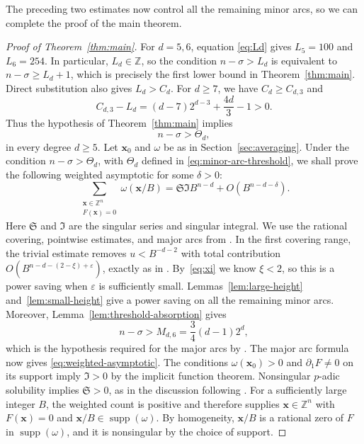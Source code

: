 \documentclass[reqno,a4paper,11pt]{amsart}
\numberwithin{equation}{section}
\newcommand{\ZZ}{\mathbb Z}
\newcommand{\x}{\mathbf{x}}
\newcommand{\eps}{\varepsilon}
\theoremstyle{plain}
\theoremstyle{definition}
\begin{document}
The preceding two estimates now control all the remaining minor arcs, so we can complete the proof of the main theorem.
\medskip

\begin{proof}[Proof of Theorem~\ref{thm:main}]
For \(d=5,6\), equation \eqref{eq:Ld} gives \(L_5=100\) and \(L_6=254\).
In particular, \(L_d\in\ZZ\), so the condition \(n-\sigma>L_d\) is equivalent to \(n-\sigma\geq L_d+1\), which is precisely the first lower bound in Theorem~\ref{thm:main}.
Direct substitution also gives \(L_d>C_d\).
For \(d\geq7\), we have \(C_d\geq C_{d,3}\) and
\[
 C_{d,3}-L_d
 =(d-7)2^{d-3}+\frac{4d}{3}-1>0.
\]
Thus the hypothesis of Theorem~\ref{thm:main} implies
\[
 n-\sigma>\Theta_d,
\]
in every degree \(d\geq5\).
Let \(\x_0\) and \(\omega\) be as in Section~\ref{sec:averaging}.
Under the condition \(n-\sigma>\Theta_d\), with \(\Theta_d\) defined in \eqref{eq:minor-arc-threshold}, we shall prove the following weighted asymptotic for some \(\delta>0\):
\begin{equation}\label{eq:weighted-asymptotic}
 \sum_{\substack{\x\in\ZZ^n\\F(\x)=0}}\omega(\x/B)
 =\mathfrak S\mathfrak I B^{n-d}
 +O(B^{n-d-\delta}).
\end{equation}
Here \(\mathfrak S\) and \(\mathfrak I\) are the singular series and singular integral.
We use the rational covering, pointwise estimates, and major arcs from \cite[Sections~3--5]{bp}.
In the first covering range, the trivial estimate removes \(u<B^{-d-2}\) with total contribution \(O(B^{n-d-(2-\xi)+\eps})\), exactly as in \cite[Proof of Lemma~4.2]{bp}.
By~\eqref{eq:xi} we know \(\xi<2\), so this is a power saving when \(\eps\) is sufficiently small.
Lemmas~\ref{lem:large-height} and~\ref{lem:small-height} give a power saving on all the remaining minor arcs.
Moreover, Lemma~\ref{lem:threshold-absorption} gives
\[
 n-\sigma>M_{d,6}
 =\frac34(d-1)2^d,
\]
which is the hypothesis required for the major arcs by \cite[Lemma~5.1]{bp}.
The major arc formula now gives \eqref{eq:weighted-asymptotic}.
The conditions \(\omega(\x_0)>0\) and \(\partial_1F\neq0\) on its support imply \(\mathfrak I>0\) by the implicit function theorem.
Nonsingular \(p\)-adic solubility implies \(\mathfrak S>0\), as in the discussion following \cite[Lemma~5.1]{bp}.
For a sufficiently large integer \(B\), the weighted count is positive and therefore supplies \(\x\in\ZZ^n\) with \(F(\x)=0\) and \(\x/B\in\operatorname{supp}(\omega)\).
By homogeneity, \(\x/B\) is a rational zero of \(F\) in \(\operatorname{supp}(\omega)\), and it is nonsingular by the choice of support.
\end{proof}
\end{document}

